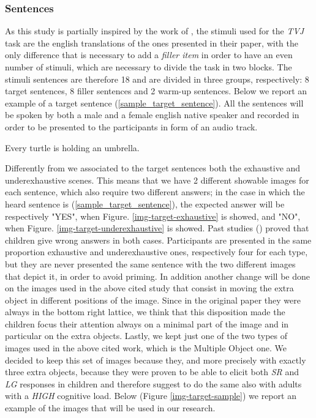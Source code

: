 \documentclass[10pt, a4]{article}
\begin{document}
\subsubsection{Sentences}
As this study is partially inspired by the work of \cite{minai2012hinders}, the stimuli used for the \textit{TVJ} task are the
english translations of the ones presented in their paper, with the only difference that is necessary to add a
\textit{filler item} in order to have an even number of stimuli, which are necessary to divide the task in two blocks.
The stimuli sentences are therefore 18 and are divided in three groups, respectively: 8 target sentences, 8 filler sentences
and 2 warm-up sentences. Below we report an example of a target sentence (\ref{sample_target_sentence}).
All the sentences will be spoken by both a male and a female english native speaker and
recorded in order to be presented to the participants in form of an audio track.

\begin{exe}
    \ex  Every turtle is holding an umbrella. \label{sample_target_sentence}
\end{exe}

Differently from \cite{minai2012hinders} we associated to the target sentences both the exhaustive and underexhaustive scenes. This means
that we have 2 different showable images for each sentence, which also require two different answers; in the case in which
the heard sentence is (\ref{sample_target_sentence}), the expected answer will be respectively "YES", when Figure. \ref{img-target-exhaustive} is showed,
and "NO", when Figure. \ref{img-target-underexhaustive} is showed. Past studies (\cite{drozil200112}) proved that children give wrong answers in both cases.
Participants are presented in the same proportion exhaustive and underexhaustive ones, respectively four for each type, but they are
never presented the same sentence with the two different images that depict it, in order to avoid priming.
In addition another change will be done on the images used in the above cited study that consist in moving the extra object in different positions
of the image. Since in the original paper they were always in the bottom right lattice, we think that this disposition made the children focus their
attention always on a minimal part of the image and in particular on the extra objects. Lastly, we kept just one of the two types of images
used in the above cited work, which is the Multiple Object one. We decided to keep this set of images because they, and more precisely with exactly
three extra objects, because they were proven to be able to elicit both \textit{SR} and \textit{LG} responses in children and therefore suggest to
do the same also with adults with a \textit{HIGH} cognitive load. Below (Figure \ref{img-target-sample}) we report an example of the images that
will be used in our research. 
\end{document}
